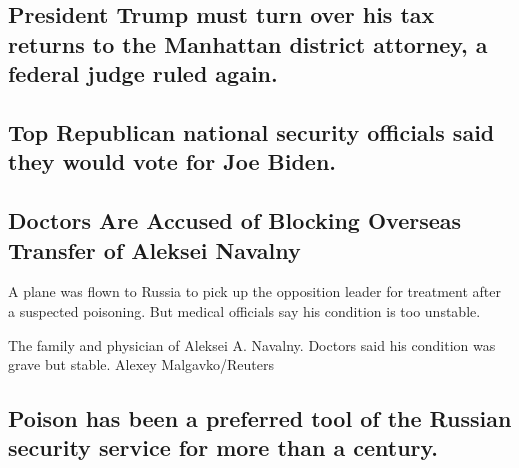 \hypertarget{president-trump-must-turn-over-his-tax-returns-to-the-manhattan-district-attorney-a-federal-judge-ruled-again}{%
\subsection{President Trump must turn over his tax returns to the
Manhattan district attorney, a federal judge ruled
again.}\label{president-trump-must-turn-over-his-tax-returns-to-the-manhattan-district-attorney-a-federal-judge-ruled-again}}

\href{/2020/08/20/us/politics/republican-national-security-biden.html}{}

\hypertarget{top-republican-national-security-officials-said-they-would-vote-for-joe-biden}{%
\subsection{Top Republican national security officials said they would
vote for Joe
Biden.}\label{top-republican-national-security-officials-said-they-would-vote-for-joe-biden}}

\href{/2020/08/21/world/europe/russia-navalny-poison-hospital.html}{}

\hypertarget{doctors-are-accused-of-blocking-overseas-transfer-of-aleksei-navalny}{%
\subsection{Doctors Are Accused of Blocking Overseas Transfer of Aleksei
Navalny}\label{doctors-are-accused-of-blocking-overseas-transfer-of-aleksei-navalny}}

A plane was flown to Russia to pick up the opposition leader for
treatment after a suspected poisoning. But medical officials say his
condition is too unstable.

\href{/2020/08/21/world/europe/russia-navalny-poison-hospital.html}{}

\href{/2020/08/21/world/europe/russia-navalny-poison-hospital.html}{}

The family and physician of Aleksei A. Navalny. Doctors said his
condition was grave but stable. Alexey Malgavko/Reuters

\href{/2020/08/20/world/europe/navalny-poison-russia-kremlin.html}{}

\hypertarget{poison-has-been-a-preferred-tool-of-the-russian-security-service-for-more-than-a-century}{%
\subsection{Poison has been a preferred tool of the Russian security
service for more than a
century.}\label{poison-has-been-a-preferred-tool-of-the-russian-security-service-for-more-than-a-century}}

